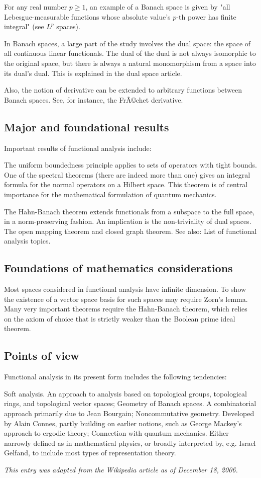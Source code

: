 \documentclass[12pt]{article}
\begin{document}
For any real number $p \ge 1$, an example of a Banach space is given by "all Lebesgue-measurable functions whose absolute value's $p$-th power has finite integral" (see $L^p$ spaces).

In Banach spaces, a large part of the study involves the dual space: the space of all continuous linear functionals. The dual of the dual is not always isomorphic to the original space, but there is always a natural monomorphism from a space into its dual's dual. This is explained in the dual space article.

Also, the notion of derivative can be extended to arbitrary functions between Banach spaces. See, for instance, the FrÃ©chet derivative.

\subsection{Major and foundational results}
Important results of functional analysis include:

The uniform boundedness principle applies to sets of operators with tight bounds. 
One of the spectral theorems (there are indeed more than one) gives an integral formula for the normal operators on a Hilbert space. This theorem is of central importance for the mathematical formulation of quantum mechanics. 

The Hahn-Banach theorem extends functionals from a subspace to the full space, in a norm-preserving fashion. An implication is the non-triviality of dual spaces. 
The open mapping theorem and closed graph theorem. 
See also: List of functional analysis topics.

\subsection{Foundations of mathematics considerations}
Most spaces considered in functional analysis have infinite dimension. To show the existence of a vector space basis for such spaces may require Zorn's lemma. Many very important theorems require the Hahn-Banach theorem, which relies on the axiom of choice that is strictly weaker than the Boolean prime ideal theorem.

\subsection{Points of view}
Functional analysis in its present form includes the following tendencies:

Soft analysis. An approach to analysis based on topological groups, topological rings, and topological vector spaces; 
Geometry of Banach spaces. A combinatorial approach primarily due to Jean Bourgain; 
Noncommutative geometry. Developed by Alain Connes, partly building on earlier notions, such as George Mackey's approach to ergodic theory; 
Connection with quantum mechanics. Either narrowly defined as in mathematical physics, or broadly interpreted by, e.g. Israel Gelfand, to include most types of representation theory. 

{\it This entry was adapted from the Wikipedia article  as of December 18, 2006.}
\end{document}

